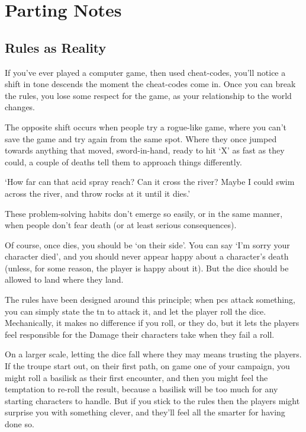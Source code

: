 \section{Parting Notes}

\begin{multicols}{2}

\subsection{Rules as Reality}

If you've ever played a computer game, then used cheat-codes, you'll notice a shift in tone descends the moment the cheat-codes come in.
Once you can break the rules, you lose some respect for the game, as your relationship to the world changes.

The opposite shift occurs when people try a rogue-like game, where you can't save the game and try again from the same spot.
Where they once jumped towards anything that moved, sword-in-hand, ready to hit `X' as fast as they could, a couple of deaths tell them to approach things differently.

\begin{speechtext}
  `How far can that acid spray reach?
  Can it cross the river?
  Maybe I could swim across the river, and throw rocks at it until it dies.'
\end{speechtext}

These problem-solving habits don't emerge so easily, or in the same manner, when people don't fear death (or at least serious consequences).

Of course, once  dies, you should be `on their side'.
You can say `I'm sorry your character died', and you should never appear happy about a character's death (unless, for some reason, the player is happy about it).
But the dice should be allowed to land where they land.

The rules have been designed around this principle; when \glspl{pc} attack something, you can simply state the \gls{tn} to attack it, and let the player roll the dice.
Mechanically, it makes no difference if you roll, or they do, but it lets the players feel responsible for the Damage their characters take when they fail a roll.

On a larger scale, letting the dice fall where they may means trusting the players.
If the troupe start out, on their first path, on game one of your campaign, you might roll a basilisk as their first encounter, and then you might feel the temptation to re-roll the result, because a basilisk will be too much for any starting characters to handle.
But if you stick to the rules then the players might surprise you with something clever, and they'll feel all the smarter for having done so.


\end{multicols}
